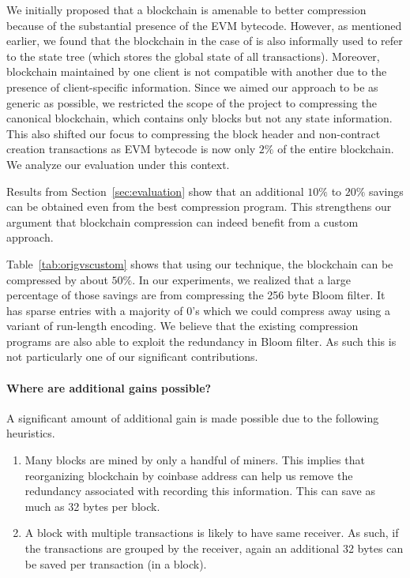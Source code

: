 We initially proposed that a blockchain is amenable to better compression because of the substantial presence of the EVM bytecode.
However, as mentioned earlier, we found that the blockchain in the case of \eth{} is also informally used to refer to the state tree (which stores the global state of all transactions).
Moreover, blockchain maintained by one \eth{} client is not compatible with another due to the presence of client-specific information.
Since we aimed our approach to be as generic as possible, we restricted the scope of the project to compressing the canonical blockchain, which contains only blocks but not any state information. 
This also shifted our focus to  compressing the block header and non-contract creation transactions as EVM bytecode is now only $2\%$ of the entire blockchain.
We analyze our evaluation under this context.

Results from Section~\ref{sec:evaluation} show that an additional $10\%$ to $20\%$ savings can be obtained even from the best compression program.
This strengthens our argument that 
blockchain compression can indeed benefit from a custom approach.

Table~\ref{tab:origvscustom} shows that using our technique, the blockchain can be compressed by about $50\%$.
In our experiments, we realized that a large percentage of those savings
are from compressing the 256 byte Bloom filter.
It has sparse entries with a majority of 0's which we could compress
away using a variant of run-length encoding.
We believe that the existing compression programs are also able to exploit
the redundancy in Bloom filter. As such this is not particularly one of 
our significant contributions.

\paragraph{Where are additional gains possible?}
A significant amount of additional gain is made possible due to the following 
heuristics.
\begin{enumerate}
\item Many blocks are mined by only a handful of miners. This implies that reorganizing blockchain by coinbase address can help us remove the redundancy associated with recording this information. This can save as much as 32 bytes per block.

\item A block with multiple transactions is likely to have same receiver. As such, if the transactions are grouped by the receiver, again an additional 32 bytes can be saved per transaction (in a block).
\end{enumerate}

